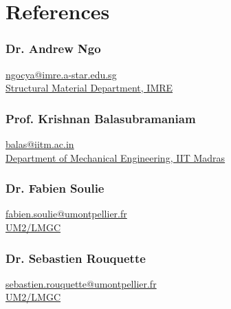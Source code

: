 \documentclass{my_cv}%
\begin{document}
\section{References}
\vspace{1em}
\begin{minipage}{0.6\textwidth}
\subsubsection{Dr. Andrew Ngo} 
\faAt \hspace{0.2em} \href{mailto:ngocya@imre.a-star.edu.sg}{ngocya@imre.a-star.edu.sg} \\
\faInstitution \hspace{0.2em} \href{http://iitm.irins.org/profile/61936}{Structural Material Department, IMRE}
\vspace{1.5em}
\subsubsection{Prof. Krishnan Balasubramaniam} 
\faAt \hspace{0.2em} \href{mailto:balas@iitm.ac.in}{balas@iitm.ac.in} \\
\hspace{0.5em} \faInstitution \hspace{0.2em} \href{http://iitm.irins.org/profile/50968}{Department of Mechanical Engineering, IIT Madras}
\vspace{1em}
\end{minipage}
\begin{minipage}{0.6\textwidth}
\subsubsection{Dr. Fabien Soulie} 
\faAt \hspace{0.2em} \href{mailto:fabien.soulie@umontpellier.fr}{fabien.soulie@umontpellier.fr}\\ \hspace{0.2em}\faInstitution \hspace{0.2em}  \href{http://www.lmgc.univ-montp2.fr/spip.php?page=pageperso&nom=SOULIE&prenom=Fabien&lang=fr}{UM2/LMGC}
\vspace{1.2em}
\subsubsection{Dr. Sebastien Rouquette} 
\faAt \hspace{0.2em} \href{mailto:sebastien.rouquette@umontpellier.fr}{sebastien.rouquette@umontpellier.fr}\\ \faInstitution \hspace{0.2em} \href{http://www.lmgc.univ-montp2.fr/spip.php?page=pageperso&nom=ROUQUETTE&prenom=Sebastien&lang=fr}{UM2/LMGC}
\end{minipage}
\end{document}
